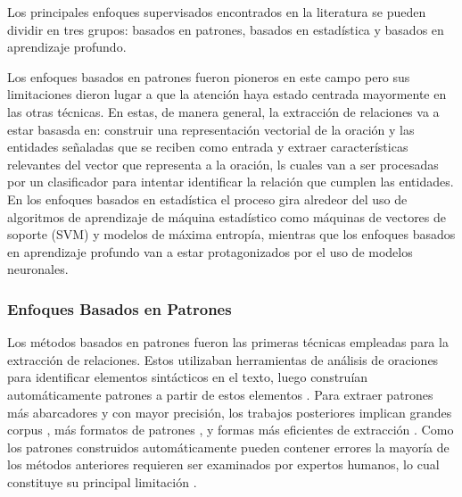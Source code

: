 Los principales enfoques supervisados encontrados en la literatura se pueden dividir en tres grupos: basados en patrones, basados en estadística y basados en aprendizaje profundo. 

Los enfoques basados en patrones fueron pioneros en este campo pero sus limitaciones dieron lugar a que la atención haya estado centrada mayormente en las otras técnicas. En estas, de manera general, la extracción de relaciones va a estar basasda en: construir una representación vectorial de la oración y las entidades señaladas que se reciben como entrada y extraer características relevantes del vector que representa a la oración, ls cuales van a ser procesadas por un clasificador para intentar identificar la relación que cumplen las entidades. En los enfoques basados en estadística el proceso gira alredeor del uso de algoritmos de aprendizaje de máquina estadístico como máquinas de vectores de soporte (SVM) y modelos de máxima entropía, mientras que los enfoques basados en aprendizaje profundo van a estar protagonizados por el uso de modelos neuronales.

\subsubsection{Enfoques Basados en Patrones}


Los métodos basados en patrones fueron las primeras técnicas empleadas para la extracción de relaciones. Estos utilizaban herramientas de análisis de oraciones
para identificar elementos sintácticos en el texto, luego construían automáticamente patrones a partir de estos elementos \cite{soderland1995crystal, kim1995acquisition,huffman1995learning, califf1997relational}. Para extraer patrones más abarcadores y con mayor precisión, los trabajos posteriores implican grandes corpus \cite{carlson2010toward}, más formatos de patrones \cite{nakashole2012patty, jiang2017metapad}, y
formas más eficientes de extracción \cite{zheng2019diagnre}. Como los patrones construidos automáticamente pueden contener errores la mayoría de los métodos anteriores requieren
ser examinados por expertos humanos, lo cual constituye su principal limitación \cite{han2020more}.



